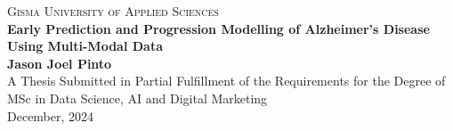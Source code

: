 \documentclass[10pt,twocolumn]{report}
\begin{document}

\begin{titlepage}
    \begin{center}
        
        \textsc{\Large Gisma University of Applied Sciences} \\[1.5cm]
        \vfill  
        {\bfseries\Huge Early Prediction and Progression Modelling of Alzheimer’s Disease \\[0.4cm]
        Using Multi-Modal Data} \\[0.4cm]
        \vfill        
        {\Large \textbf{Jason Joel Pinto}} \\[2cm]
        \vfill
        {\large A Thesis Submitted in Partial Fulfillment of the Requirements for the Degree of} \\[0.5cm]
        {\Large MSc in Data Science, AI and Digital Marketing} \\[1.5cm]
        
        {\large December, 2024}
        
        \vfill
    \end{center}
\end{titlepage}
\end{document}
